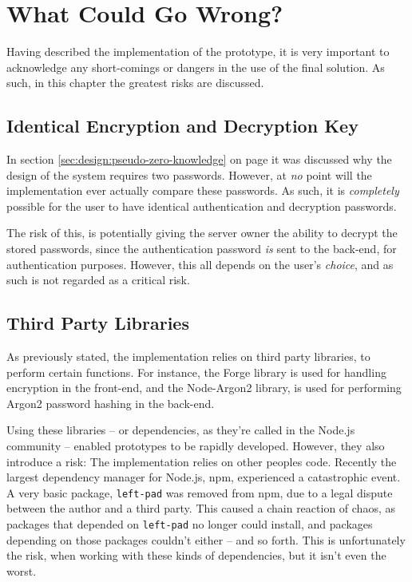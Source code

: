 \chapter{What Could Go Wrong?}
	Having described the implementation of the prototype, it is very important to acknowledge any short-comings or dangers in the use of the final solution. As such, in this chapter the greatest risks are discussed.

	\section{Identical Encryption and Decryption Key}
		In section \ref{sec:design:pseudo-zero-knowledge} on page \pageref{sec:design:pseudo-zero-knowledge} it was discussed why the design of the system requires two passwords. However, at \emph{no} point will the implementation ever actually compare these passwords. As such, it is \emph{completely} possible for the user to have identical authentication and decryption passwords.

		The risk of this, is potentially giving the server owner the ability to decrypt the stored passwords, since the authentication password \emph{is} sent to the back-end, for authentication purposes. However, this all depends on the user's \emph{choice}, and as such is not regarded as a critical risk.

	\section{Third Party Libraries}
		As previously stated, the implementation relies on third party libraries, to perform certain functions. For instance, the Forge library is used for handling encryption in the front-end, and the Node-Argon2 library, is used for performing Argon2 password hashing in the back-end. 

		Using these libraries -- or dependencies, as they're called in the Node.js community -- enabled prototypes to be rapidly developed. However, they also introduce a risk: The implementation relies on other peoples code. Recently the largest dependency manager for Node.js, npm, experienced a catastrophic event. A very basic package, \verb=left-pad= was removed from npm, due to a legal dispute between the author and a third party\cite{npm_leftpad}. This caused a chain reaction of chaos, as packages that depended on \verb=left-pad= no longer could install, and packages depending on those packages couldn't either -- and so forth. This is unfortunately the risk, when working with these kinds of dependencies, but it isn't even the worst.

